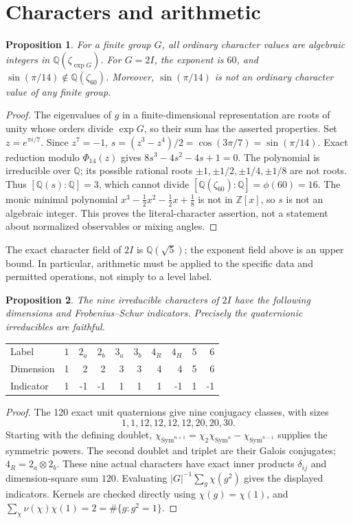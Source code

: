 \documentclass[11pt,a4paper]{amsart}
\newtheorem{proposition}{Proposition}[section]
\newcommand{\Q}{\mathbb Q}
\newcommand{\Z}{\mathbb Z}
\newcommand{\Sym}{\mathrm{Sym}}
\begin{document}
\section{Characters and arithmetic}
\begin{proposition}
For a finite group $G$, all ordinary character values are algebraic
integers in $\Q(\zeta_{\exp G})$. For $G=2I$, the exponent is $60$,
and $\sin(\pi/14)\notin\Q(\zeta_{60})$.
Moreover, $\sin(\pi/14)$ is not an ordinary character value of any finite group.
\end{proposition}
\begin{proof}
The eigenvalues of $g$ in a finite-dimensional representation are roots of
unity whose orders divide $\exp G$, so their sum has the asserted properties.
Set $z=e^{\pi i/7}$. Since $z^7=-1$,
$s=(z^3-z^4)/2=\cos(3\pi/7)=\sin(\pi/14)$.
Exact reduction modulo $\Phi_{14}(z)$ gives
$8s^3-4s^2-4s+1=0$. The polynomial is irreducible over $\Q$;
its possible rational roots $\pm1,\pm1/2,\pm1/4,\pm1/8$ are not roots.
Thus $[\Q(s):\Q]=3$, which cannot divide
$[\Q(\zeta_{60}):\Q]=\phi(60)=16$.
The monic minimal polynomial
$x^3-\tfrac12x^2-\tfrac12x+\tfrac18$ is not in $\Z[x]$, so $s$ is not an
algebraic integer. This proves the literal-character assertion, not a
statement about normalized observables or mixing angles.
\end{proof}

The exact character field of $2I$ is $\Q(\sqrt5)$; the exponent field above
is an upper bound. In particular, arithmetic must be applied to the
specific data and permitted operations, not simply to a level label.

\begin{proposition}
The nine irreducible characters of $2I$ have the following dimensions and
Frobenius--Schur indicators. Precisely the quaternionic irreducibles are
faithful.
\end{proposition}
\begin{center}
\begin{tabular}{lrrrrrrrrr}
\toprule
Label & $1$ & $2_a$ & $2_b$ & $3_a$ & $3_b$ & $4_R$ & $4_H$ & $5$ & $6$\\
Dimension & 1&2&2&3&3&4&4&5&6\\
Indicator & 1&-1&-1&1&1&1&-1&1&-1\\
\bottomrule
\end{tabular}
\end{center}
\begin{proof}
The 120 exact unit quaternions give nine conjugacy classes, with sizes
\[1,1,12,12,12,12,20,20,30.\] Starting with the defining doublet,
$\chi_{\Sym^{n+1}}=\chi_2\chi_{\Sym^n}-\chi_{\Sym^{n-1}}$ supplies the
symmetric powers. The second doublet and triplet are their Galois
conjugates; $4_R=2_a\otimes2_b$. These nine actual characters have exact
inner products $\delta_{ij}$ and dimension-square sum $120$.
Evaluating $|G|^{-1}\sum_g\chi(g^2)$ gives the displayed indicators.
Kernels are checked directly using $\chi(g)=\chi(1)$, and
$\sum_\chi\nu(\chi)\chi(1)=2=\#\{g:g^2=1\}$.
\end{proof}
\end{document}

